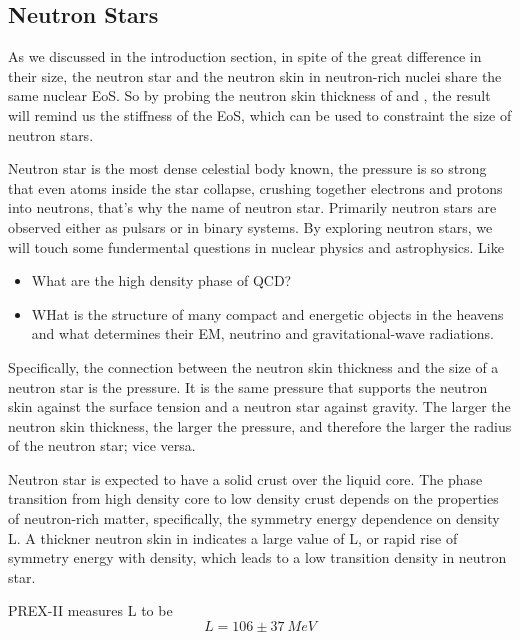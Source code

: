 \subsection{Neutron Stars}
As we discussed in the introduction section, in spite of the great difference
in their size, the neutron star and the neutron skin in neutron-rich nuclei
share the same nuclear EoS. So by probing the neutron skin thickness of \Pb and
\Ca, the result will remind us the stiffness of the EoS, which can be used to
constraint the size of neutron stars.

Neutron star is the most dense celestial body known, the pressure is so strong
that even atoms inside the star collapse, crushing together electrons
and protons into neutrons, that's why the name of neutron star. Primarily neutron
stars are observed either as pulsars or in binary systems. By exploring
neutron stars, we will touch some fundermental questions in nuclear physics and 
astrophysics. Like
\begin{itemize}
    \item What are the high density phase of QCD?
    \item WHat is the structure of many compact and energetic objects in the heavens
	and what determines their EM, neutrino and gravitational-wave radiations.
\end{itemize}

Specifically, the connection between the neutron skin thickness and the size of
a neutron star is the pressure. It is the same pressure that supports the neutron
skin against the surface tension and a neutron star against gravity. 
The larger the neutron skin thickness, the larger the pressure, and therefore 
the larger the radius of the neutron star; vice versa.

Neutron star is expected to have a solid crust over the liquid core. The phase transition
from high density core to low density crust depends on the properties of
neutron-rich matter, specifically, the symmetry energy dependence on density L.
A thickner neutron skin in \Pb indicates a large value of L, or rapid rise of
symmetry energy with density, which leads to a low transition density in neutron
star.

PREX-II measures L to be
\begin{equation}
    L = 106 \pm 37 \ MeV
\end{equation}

